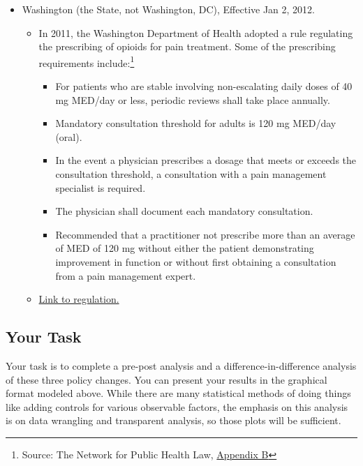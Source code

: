 \documentclass[12pt]{article}
\begin{document}
\begin{itemize}
\begin{itemize}
  \end{itemize}
  \item Washington (the State, not Washington, DC), Effective Jan 2, 2012.
  \begin{itemize}
    \item In 2011, the Washington Department of Health adopted a rule regulating the prescribing of opioids for pain treatment. Some of the prescribing requirements include:\footnote{Source: The Network for Public Health Law, \href{https://azdhs.gov/documents/prevention/womens-childrens-health/injury-prevention/opioid-prevention/appendix-b-state-by-state-summary.pdf}{Appendix B}}
    \begin{itemize}
      \item For patients who are stable involving non-escalating daily doses of 40 mg MED/day or less, periodic reviews shall take place annually.
      \item Mandatory consultation threshold for adults is 120 mg MED/day (oral).
      \item In the event a physician prescribes a dosage that meets or exceeds the consultation
      threshold, a consultation with a pain management specialist is required.
      \item The physician shall document each mandatory consultation.
      \item Recommended that a practitioner not prescribe more than an average of MED of
      120 mg without either the patient demonstrating improvement in function or without first obtaining a consultation from a pain management expert.
    \end{itemize}
    \item \href{http://apps.leg.wa.gov/documents/laws/wsr/2011/12/11-12-025.htm}{Link to regulation.}
    \end{itemize}
\end{itemize}


\subsection*{Your Task}

Your task is to complete a pre-post analysis and a difference-in-difference analysis of these three policy changes. You can present your results in the graphical format modeled above. While there are many statistical methods of doing things like adding controls for various observable factors, the emphasis on this analysis is on data wrangling and transparent analysis, so those plots will be sufficient.
\end{document}
